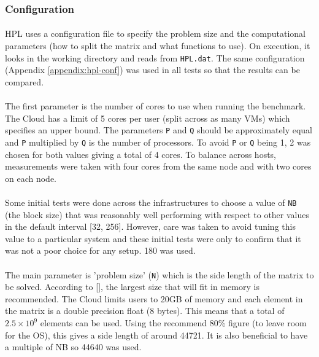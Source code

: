 \documentclass{article}
\begin{document}
        \subsubsection{Configuration}
            \paragraph{}
            HPL uses a configuration file to specify the problem size and the computational parameters (how to split the matrix and what functions to use). On execution, it looks in the working directory and reads from \verb|HPL.dat|. The same configuration (Appendix \ref{appendix:hpl-conf}) was used in all tests so that the results can be compared.


            \paragraph{}
            The first parameter is the number of cores to use when running the benchmark. The Cloud has a limit of 5 cores per user (split across as many VMs) which specifies an upper bound. The parameters \verb|P| and \verb|Q| should be approximately equal and \verb|P| multiplied by \verb|Q| is the number of processors. To avoid \verb|P| or \verb|Q| being 1, 2 was chosen for both values giving a total of 4 cores. To balance across hosts, measurements were taken with four cores from the same node and with two cores on each node.

            \paragraph{}
            Some initial tests were done across the infrastructures to choose a value of \verb|NB| (the block size) that was reasonably well performing with respect to other values in the default interval [32, 256]. However, care was taken to avoid tuning this value to a particular system and these initial tests were only to confirm that it was not a poor choice for any setup. 180 was used.

            \paragraph{}
            The main parameter is 'problem size' (\verb|N|)  which is the side length of the matrix to be solved. According to [\cite{hpl2016}], the largest size that will fit in memory is recommended. The Cloud limits users to 20GB of memory and each element in the matrix is a double precision float (8 bytes). This means that a total of $2.5 \times 10 ^ 9$ elements can be used. Using the recommend 80\% figure (to leave room for the OS), this gives a side length of around 44721. It is also beneficial to have a multiple of NB so 44640 was used.
\end{document}
